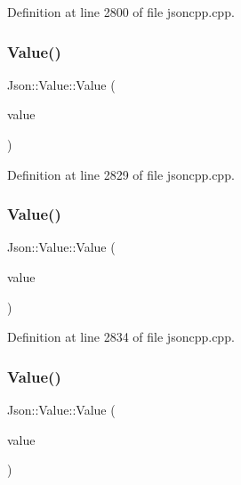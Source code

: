 Definition at line 2800 of file jsoncpp.\+cpp.

\hypertarget{class_json_1_1_value_a4744ae571fcf34f4b16a2257b3b3b585}{}\label{class_json_1_1_value_a4744ae571fcf34f4b16a2257b3b3b585} 
\subsubsection{\texorpdfstring{Value()}{Value()}\hspace{0.1cm}{\footnotesize\ttfamily [2/24]}}
{\footnotesize\ttfamily Json\+::\+Value\+::\+Value (\begin{DoxyParamCaption}\item[{\hyperlink{class_json_1_1_value_abdf7a7ff73eb130ffcab28504ffdb405}{Int}}]{value }\end{DoxyParamCaption})}



Definition at line 2829 of file jsoncpp.\+cpp.

\hypertarget{class_json_1_1_value_ae67a857b01286e3499a87e95be848d20}{}\label{class_json_1_1_value_ae67a857b01286e3499a87e95be848d20} 
\subsubsection{\texorpdfstring{Value()}{Value()}\hspace{0.1cm}{\footnotesize\ttfamily [3/24]}}
{\footnotesize\ttfamily Json\+::\+Value\+::\+Value (\begin{DoxyParamCaption}\item[{\hyperlink{class_json_1_1_value_a0933d59b45793ae4aade1757c322a98d}{U\+Int}}]{value }\end{DoxyParamCaption})}



Definition at line 2834 of file jsoncpp.\+cpp.

\hypertarget{class_json_1_1_value_ab1cdc3d9a4d4cc03fa01439d43ceb1b5}{}\label{class_json_1_1_value_ab1cdc3d9a4d4cc03fa01439d43ceb1b5} 
\subsubsection{\texorpdfstring{Value()}{Value()}\hspace{0.1cm}{\footnotesize\ttfamily [4/24]}}
{\footnotesize\ttfamily Json\+::\+Value\+::\+Value (\begin{DoxyParamCaption}\item[{\hyperlink{class_json_1_1_value_a1b86af9f85f0f1baa972c3319fa22695}{Int64}}]{value }\end{DoxyParamCaption})}



